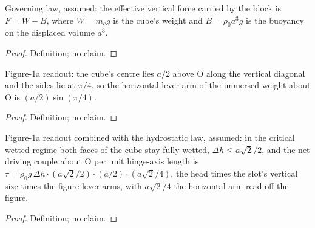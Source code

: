\begin{definition}
\label{def:IPhO2026Problems_problem_IPhO_2026_1_A_1:IsNetImmersedWeight}
Governing law, assumed: the effective vertical force carried by the block is
$F = W - B$, where $W = m_c g$ is the cube's weight and
$B = \rho_0 a^3 g$ is the buoyancy on the displaced volume $a^3$.
\end{definition}
\begin{proof}
Definition; no claim.
\end{proof}

\begin{definition}
\label{def:IPhO2026Problems_problem_IPhO_2026_1_A_1:weightHorizontalLeverArm}
Figure-1a readout: the cube's centre lies $a/2$ above O along the vertical
diagonal and the sides lie at $\pi/4$, so the horizontal lever arm of the
immersed weight about O is $(a/2)\sin(\pi/4)$.
\end{definition}
\begin{proof}
Definition; no claim.
\end{proof}

\begin{definition}
\label{def:IPhO2026Problems_problem_IPhO_2026_1_A_1:PressureMomentReadout}
Figure-1a readout combined with the hydrostatic law, assumed: in the critical
wetted regime both faces of the cube stay fully wetted,
$\Delta h \le a\sqrt{2}/2$, and the net driving couple about O per unit
hinge-axis length is
$\tau = \rho_0 g\, \Delta h \cdot (a\sqrt{2}/2) \cdot (a/2) \cdot
(a\sqrt{2}/4)$, the head times the slot's vertical size times the figure
lever arms, with $a\sqrt{2}/4$ the horizontal arm read off the figure.
\end{definition}
\begin{proof}
Definition; no claim.
\end{proof}

